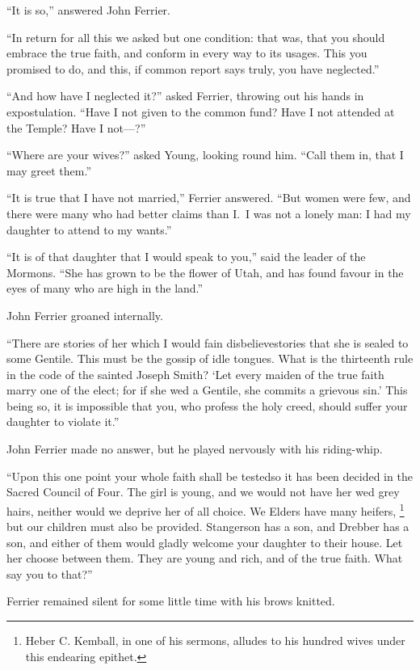\documentclass[12pt,english]{book}
\begin{document}
{}``It is so,'' answered John Ferrier.

{}``In return for all this we asked but one condition: that was,
that you should embrace the true faith, and conform in every way to
its usages. This you promised to do, and this, if common report says
truly, you have neglected.''

{}``And how have I neglected it?'' asked Ferrier, throwing out his
hands in expostulation. {}``Have I not given to the common fund?
Have I not attended at the Temple? Have I not\mbox{---}?''

{}``Where are your wives?'' asked Young, looking round him. {}``Call
them in, that I may greet them.''

{}``It is true that I have not married,'' Ferrier answered. {}``But
women were few, and there were many who had better claims than I.\ 
I was not a lonely man: I had my daughter to attend to my wants.''

{}``It is of that daughter that I would speak to you,'' said the
leader of the Mormons. {}``She has grown to be the flower of Utah,
and has found favour in the eyes of many who are high in the land.''

John Ferrier groaned internally.

{}``There are stories of her which I would fain disbelieve\mdsh{---}stories
that she is sealed to some Gentile. This must be the gossip of idle
tongues. What is the thirteenth rule in the code of the sainted Joseph
Smith? `Let every maiden of the true faith marry one of the elect;
for if she wed a Gentile, she commits a grievous sin.' This being
so, it is impossible that you, who profess the holy creed, should
suffer your daughter to violate it.''

John Ferrier made no answer, but he played nervously with his riding-whip.

{}``Upon this one point your whole faith shall be tested\mdsh{---}so
it has been decided in the Sacred Council of Four. The girl is young,
and we would not have her wed grey hairs, neither would we deprive
her of all choice. We Elders have many heifers,%
\footnote{Heber C. Kemball, in one of his sermons, alludes to his hundred wives
under this endearing epithet.%
} but our children must also be provided. Stangerson has a son, and
Drebber has a son, and either of them would gladly welcome your daughter
to their house. Let her choose between them. They are young and rich,
and of the true faith. What say you to that?''

Ferrier remained silent for some little time with his brows knitted.
\end{document}
